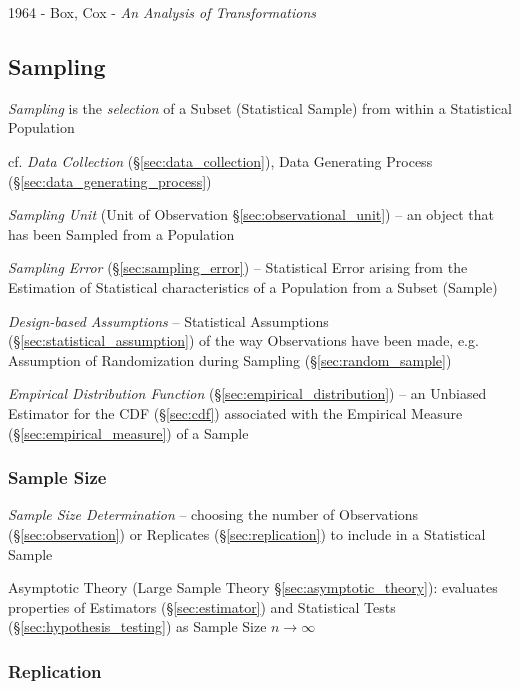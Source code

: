 1964 - Box, Cox - \emph{An Analysis of Transformations}



\subsection{Sampling}\label{sec:sampling}

\emph{Sampling} is the \emph{selection} of a Subset (Statistical Sample) from
within a Statistical Population

\fist cf. \emph{Data Collection} (\S\ref{sec:data_collection}), Data Generating
Process (\S\ref{sec:data_generating_process})

\fist \emph{Sampling Unit} (Unit of Observation \S\ref{sec:observational_unit})
-- an object that has been Sampled from a Population

\fist \emph{Sampling Error} (\S\ref{sec:sampling_error}) -- Statistical Error
arising from the Estimation of Statistical characteristics of a Population from
a Subset (Sample)

\fist \emph{Design-based Assumptions} -- Statistical Assumptions
(\S\ref{sec:statistical_assumption}) of the way Observations have been made,
e.g. Assumption of Randomization during Sampling (\S\ref{sec:random_sample})

\emph{Empirical Distribution Function} (\S\ref{sec:empirical_distribution}) --
an Unbiased Estimator for the CDF (\S\ref{sec:cdf}) associated with the
Empirical Measure (\S\ref{sec:empirical_measure}) of a Sample



\subsubsection{Sample Size}\label{sec:sample_size}

\emph{Sample Size Determination} -- choosing the number of Observations
(\S\ref{sec:observation}) or Replicates (\S\ref{sec:replication}) to include in
a Statistical Sample

\fist Asymptotic Theory (Large Sample Theory \S\ref{sec:asymptotic_theory}):
evaluates properties of Estimators (\S\ref{sec:estimator}) and Statistical Tests
(\S\ref{sec:hypothesis_testing}) as Sample Size $n \to \infty$



\subsubsection{Replication}\label{sec:sampling_replication}

